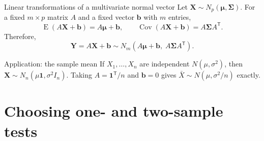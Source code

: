 \documentclass[aspectratio=169,11pt]{beamer}
\newcommand{\E}{\operatorname{E}}
\begin{document}
\begin{frame}{Linear transformations of a multivariate normal vector}
  \small
  Let \(\mathbf X\sim N_p(\boldsymbol\mu,\boldsymbol\Sigma)\).
  For a fixed \(m\times p\) matrix \(A\) and a fixed vector \(\mathbf b\) with \(m\) entries,
  \[
    \E(A\mathbf X+\mathbf b)=A\boldsymbol\mu+\mathbf b,\qquad
    \operatorname{Cov}(A\mathbf X+\mathbf b)=A\boldsymbol\Sigma A^{\mathsf T}.
  \]
  Therefore,
  \[
    {\mathbf Y=A\mathbf X+\mathbf b
      \sim N_m(A\boldsymbol\mu+\mathbf b,\;A\boldsymbol\Sigma A^{\mathsf T})}.
  \]
  \begin{block}{Application: the sample mean}
    If \(X_1,\ldots,X_n\) are independent \(N(\mu,\sigma^2)\),
    then \(\mathbf X\sim N_n(\mu\mathbf 1,\sigma^2 I_n)\).
    Taking \(A=\mathbf 1^{\mathsf T}/n\) and \(\mathbf b=0\) gives
    \(\bar X\sim N(\mu,\sigma^2/n)\) exactly.
  \end{block}
\end{frame}
\section{Choosing one- and two-sample tests}
\end{document}
